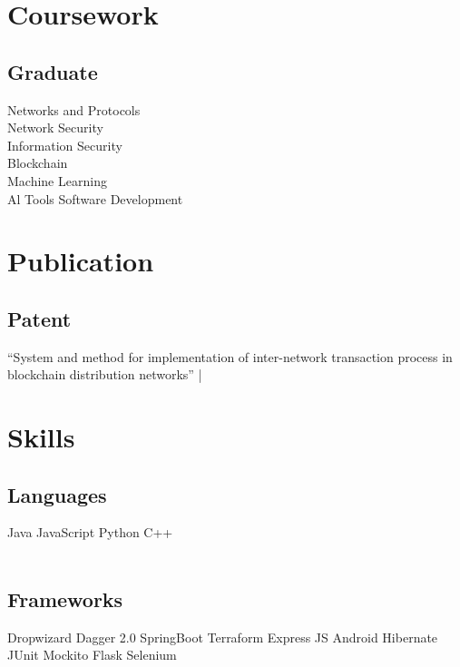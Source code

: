 \documentclass[]{resume-openfont}
\begin{document}
\begin{minipage}[t]{0.33\textwidth}

\section{Coursework}
\subsection{Graduate}
Networks and Protocols \\
Network Security \\
Information Security \\
Blockchain \\
Machine Learning \\
Al Tools Software Development \\
\sectionsep

\section{Publication}
\subsection{Patent}
“System and method for implementation of inter-network transaction process in blockchain distribution networks”  | \href{https://patentscope.wipo.int/search/en/detail.jsf?docId=IN326376132}{\faLink}



\section{Skills}
\subsection{Languages}
Java \textbullet{}   JavaScript \textbullet{} Python \textbullet{} C++ \\~\\
\subsection{Frameworks}
Dropwizard \textbullet{} Dagger 2.0 \textbullet{} SpringBoot \textbullet{} Terraform \textbullet{} Express JS \textbullet{} Android \textbullet{} Hibernate \textbullet{} JUnit \textbullet{} Mockito \textbullet{} Flask \textbullet{} Selenium \\~\\

\end{minipage}
\end{document}
